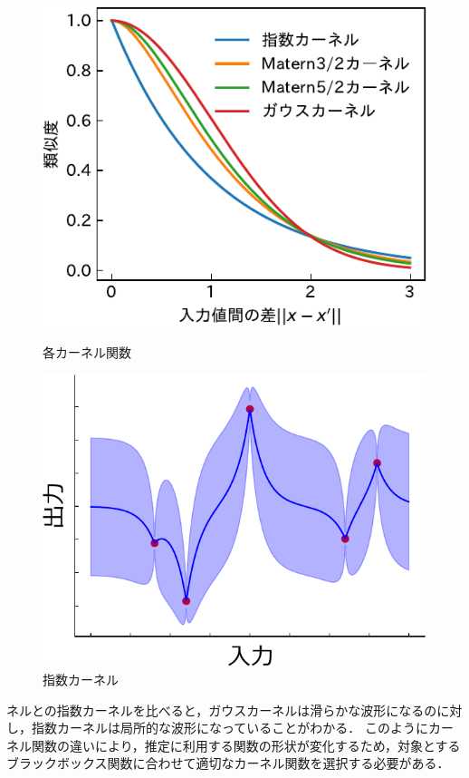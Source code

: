 \documentclass[twocolumn]{ltjarticle}
\begin{document}
\begin{figure}[H]
	\centering
	\begin{minipage}[t]{0.45\columnwidth}
		\centering
		\includegraphics[width=\columnwidth]{./figures/kernel-crop.pdf}
		\vspace*{-0.8cm}
		\caption{各カーネル関数} \label{fig:matern_graph}
	\end{minipage}
	\hspace{0.1mm}
	\begin{minipage}[t]{0.42\columnwidth}
		\centering
		\includegraphics[width=\columnwidth]{figures/material_8_exp.pdf}
		\vspace*{-0.8cm}
		\caption{指数カーネル} \label{fig:exp_kernel}
	\end{minipage}
\end{figure}
\noindent
ネルとの指数カーネルを比べると，ガウスカーネルは滑らかな波形になるのに対し，指数カーネルは局所的な波形になっていることがわかる．
このようにカーネル関数の違いにより，推定に利用する関数の形状が変化するため，対象とするブラックボックス関数に合わせて適切なカーネル関数を選択する必要がある．
\end{document}
